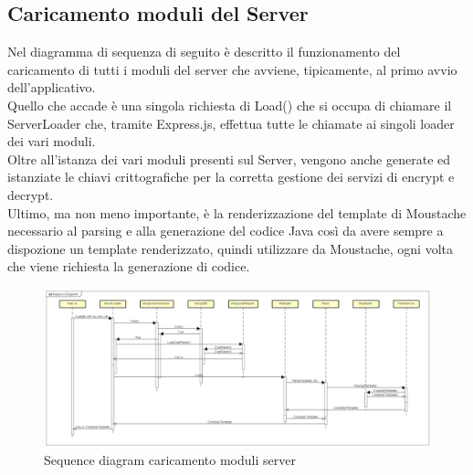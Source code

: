 	\subsection{Caricamento moduli del Server}
		Nel diagramma di sequenza di seguito è descritto il funzionamento del caricamento di tutti i moduli del server che avviene, tipicamente,
		al primo avvio dell'applicativo.\\
		Quello che accade è una singola richiesta di Load() che si occupa di chiamare il ServerLoader che, tramite Express.js, effettua tutte
		le chiamate ai singoli loader dei vari moduli.\\
		Oltre all'istanza dei vari moduli presenti sul Server, vengono anche generate ed istanziate le chiavi crittografiche per la corretta gestione dei servizi di
		encrypt e decrypt.\\
		Ultimo, ma non meno importante, è la renderizzazione del template di Moustache necessario al parsing e alla generazione del codice Java così da avere sempre a dispozione
		un template renderizzato, quindi utilizzare da Moustache, ogni volta che viene richiesta la generazione di codice.\\
		\begin{figure}[h!]
			\centering
			\includegraphics[scale=0.2]{Sequence/serverLoading.png}
			\caption{Sequence diagram caricamento moduli server}
		\end{figure}

